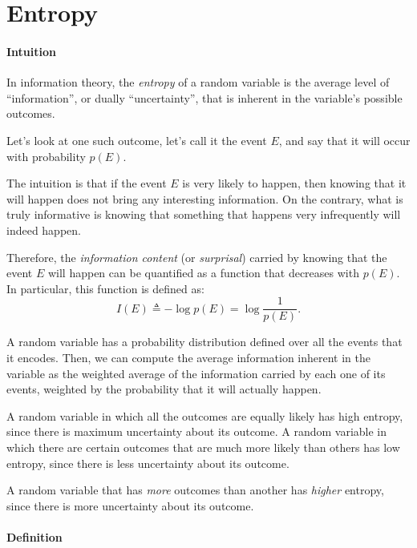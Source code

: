 
\section{Entropy}

\paragraph{Intuition}

In information theory, the \emph{entropy} of a random variable is the average level of ``information'', or dually ``uncertainty'', that is inherent in the variable's possible outcomes.

Let's look at one such outcome, let's call it the event $E$, and say that it will occur with probability $p(E)$.

The intuition is that if the event $E$ is very likely to happen, then knowing that it will happen does not bring any interesting information. On the contrary, what is truly informative is knowing that something that happens very infrequently will indeed happen.

Therefore, the \emph{information content} (or \emph{surprisal}) carried by knowing that the event $E$ will happen can be quantified as a function that decreases with $p(E)$. In particular, this function is defined as:
\begin{equation}
	I(E) \triangleq -\log p(E) = \log \frac{1}{p(E)}.
\end{equation}

A random variable has a probability distribution defined over all the events that it encodes. Then, we can compute the average information inherent in the variable as the weighted average of the information carried by each one of its events, weighted by the probability that it will actually happen. 

A random variable in which all the outcomes are equally likely has high entropy, since there is maximum uncertainty about its outcome. A random variable in which there are certain outcomes that are much more likely than others has low entropy, since there is less uncertainty about its outcome.

A random variable that has \emph{more} outcomes than another has \emph{higher} entropy, since there is more uncertainty about its outcome.

\paragraph{Definition}

